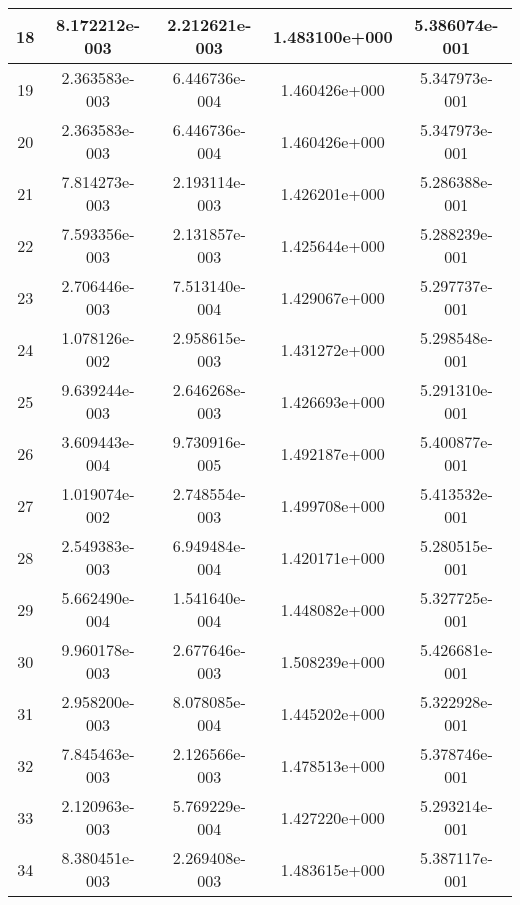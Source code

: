 \begin{table}[!ht]
\begin{center}
\begin{tabular}{|c|c|c|c|c|}
18 & 8.172212e-003&2.212621e-003
&1.483100e+000&5.386074e-001\\\hline 19 &
2.363583e-003&6.446736e-004 &1.460426e+000&5.347973e-001\\\hline 20
& 2.363583e-003&6.446736e-004 &1.460426e+000&5.347973e-001\\\hline
21 & 7.814273e-003&2.193114e-003
&1.426201e+000&5.286388e-001\\\hline 22 &
7.593356e-003&2.131857e-003 &1.425644e+000&5.288239e-001\\\hline 23
& 2.706446e-003&7.513140e-004 &1.429067e+000&5.297737e-001\\\hline
24 & 1.078126e-002&2.958615e-003
&1.431272e+000&5.298548e-001\\\hline 25 &
9.639244e-003&2.646268e-003 &1.426693e+000&5.291310e-001\\\hline 26
& 3.609443e-004&9.730916e-005 &1.492187e+000&5.400877e-001\\\hline
27 & 1.019074e-002&2.748554e-003
&1.499708e+000&5.413532e-001\\\hline 28 &
2.549383e-003&6.949484e-004 &1.420171e+000&5.280515e-001\\\hline 29
& 5.662490e-004&1.541640e-004 &1.448082e+000&5.327725e-001\\\hline
30 & 9.960178e-003&2.677646e-003
&1.508239e+000&5.426681e-001\\\hline 31 &
2.958200e-003&8.078085e-004 &1.445202e+000&5.322928e-001\\\hline 32
& 7.845463e-003&2.126566e-003 &1.478513e+000&5.378746e-001\\\hline
33 & 2.120963e-003&5.769229e-004
&1.427220e+000&5.293214e-001\\\hline 34 &
8.380451e-003&2.269408e-003 &1.483615e+000&5.387117e-001\\\hline
\end{tabular}
\end{center}
\end{table}

